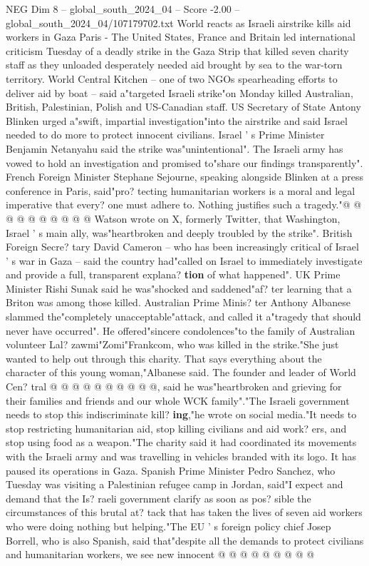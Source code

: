 \begin{textsample}{NEG Dim 8 – global\_south\_2024\_04 – Score -2.00 – global\_south\_2024\_04/107179702.txt}  \label{ex:f8_neg_033}
World reacts as Israeli airstrike kills aid workers in Gaza Paris - The United States, France and Britain led international criticism Tuesday of a deadly strike in the Gaza Strip that killed seven charity staff as they unloaded desperately needed aid brought by sea to the war-torn territory.
World Central Kitchen -- one of two NGOs spearheading efforts to deliver aid by boat -- said a"targeted Israeli strike"on Monday killed Australian, British, Palestinian, Polish and US-Canadian staff.
US Secretary of State Antony Blinken urged a"swift, impartial investigation"into the airstrike and said Israel needed to do more to protect innocent civilians.
Israel ' s Prime Minister Benjamin Netanyahu said the strike was"unintentional".
The Israeli army has vowed to hold an investigation and promised to"share our findings transparently".
French Foreign Minister Stephane Sejourne, speaking alongside Blinken at a press conference in Paris, said"pro? tecting humanitarian workers is a moral and legal imperative that every? one must adhere to.
Nothing justifies such a tragedy."@ @ @ @ @ @ @ @ @ @ Watson wrote on X, formerly Twitter, that Washington, Israel ' s main ally, was"heartbroken and deeply troubled by the strike".
British Foreign Secre? tary David Cameron -- who has been increasingly critical of Israel ' s war in Gaza -- said the country had"called on Israel to immediately investigate and provide a full, transparent explana? \textbf{tion} of what happened".
UK Prime Minister Rishi Sunak said he was"shocked and saddened"af? ter learning that a Briton was among those killed.
Australian Prime Minis? ter Anthony Albanese slammed the"completely unacceptable"attack, and called it a"tragedy that should never have occurred".
He offered"sincere condolences"to the family of Australian volunteer Lal? zawmi"Zomi"Frankcom, who was killed in the strike."She just wanted to help out through this charity.
That says everything about the character of this young woman,"Albanese said.
The founder and leader of World Cen? tral @ @ @ @ @ @ @ @ @ @, said he was"heartbroken and grieving for their families and friends and our whole WCK family"."The Israeli government needs to stop this indiscriminate kill? \textbf{ing},"he wrote on social media."It needs to stop restricting humanitarian aid, stop killing civilians and aid work? ers, and stop using food as a weapon."The charity said it had coordinated its movements with the Israeli army and was travelling in vehicles branded with its logo.
It has paused its operations in Gaza.
Spanish Prime Minister Pedro Sanchez, who Tuesday was visiting a Palestinian refugee camp in Jordan, said"I expect and demand that the Is? raeli government clarify as soon as pos? sible the circumstances of this brutal at? tack that has taken the lives of seven aid workers who were doing nothing but helping."The EU ' s foreign policy chief Josep Borrell, who is also Spanish, said that"despite all the demands to protect civilians and humanitarian workers, we see new innocent @ @ @ @ @ @ @ @ @

\end{textsample}
